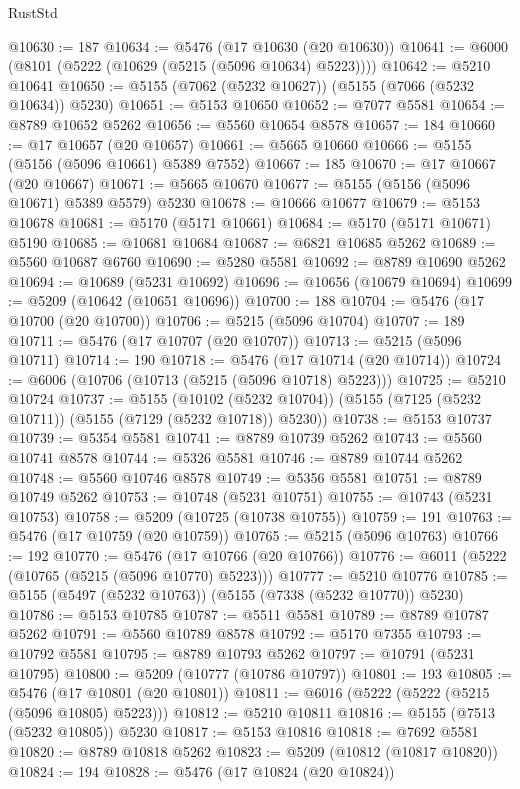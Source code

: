 \begin{lexlean}{RustStd}
\begin{coremodule}
@10630 := 187
@10634 := @5476 (@17 @10630 (@20 @10630))
@10641 := @6000 (@8101 (@5222 (@10629 (@5215 (@5096 @10634) @5223))))
@10642 := @5210 @10641
@10650 := @5155 (@7062 (@5232 @10627)) (@5155 (@7066 (@5232 @10634)) @5230)
@10651 := @5153 @10650
@10652 := @7077 @5581
@10654 := @8789 @10652 @5262
@10656 := @5560 @10654 @8578
@10657 := 184
@10660 := @17 @10657 (@20 @10657)
@10661 := @5665 @10660
@10666 := @5155 (@5156 (@5096 @10661) @5389 @7552)
@10667 := 185
@10670 := @17 @10667 (@20 @10667)
@10671 := @5665 @10670
@10677 := @5155 (@5156 (@5096 @10671) @5389 @5579) @5230
@10678 := @10666 @10677
@10679 := @5153 @10678
@10681 := @5170 (@5171 @10661)
@10684 := @5170 (@5171 @10671) @5190
@10685 := @10681 @10684
@10687 := @6821 @10685 @5262
@10689 := @5560 @10687 @6760
@10690 := @5280 @5581
@10692 := @8789 @10690 @5262
@10694 := @10689 (@5231 @10692)
@10696 := @10656 (@10679 @10694)
@10699 := @5209 (@10642 (@10651 @10696))
@10700 := 188
@10704 := @5476 (@17 @10700 (@20 @10700))
@10706 := @5215 (@5096 @10704)
@10707 := 189
@10711 := @5476 (@17 @10707 (@20 @10707))
@10713 := @5215 (@5096 @10711)
@10714 := 190
@10718 := @5476 (@17 @10714 (@20 @10714))
@10724 := @6006 (@10706 (@10713 (@5215 (@5096 @10718) @5223)))
@10725 := @5210 @10724
@10737 := @5155
    (@10102 (@5232 @10704))
    (@5155 (@7125 (@5232 @10711)) (@5155 (@7129 (@5232 @10718)) @5230))
@10738 := @5153 @10737
@10739 := @5354 @5581
@10741 := @8789 @10739 @5262
@10743 := @5560 @10741 @8578
@10744 := @5326 @5581
@10746 := @8789 @10744 @5262
@10748 := @5560 @10746 @8578
@10749 := @5356 @5581
@10751 := @8789 @10749 @5262
@10753 := @10748 (@5231 @10751)
@10755 := @10743 (@5231 @10753)
@10758 := @5209 (@10725 (@10738 @10755))
@10759 := 191
@10763 := @5476 (@17 @10759 (@20 @10759))
@10765 := @5215 (@5096 @10763)
@10766 := 192
@10770 := @5476 (@17 @10766 (@20 @10766))
@10776 := @6011 (@5222 (@10765 (@5215 (@5096 @10770) @5223)))
@10777 := @5210 @10776
@10785 := @5155 (@5497 (@5232 @10763)) (@5155 (@7338 (@5232 @10770)) @5230)
@10786 := @5153 @10785
@10787 := @5511 @5581
@10789 := @8789 @10787 @5262
@10791 := @5560 @10789 @8578
@10792 := @5170 @7355
@10793 := @10792 @5581
@10795 := @8789 @10793 @5262
@10797 := @10791 (@5231 @10795)
@10800 := @5209 (@10777 (@10786 @10797))
@10801 := 193
@10805 := @5476 (@17 @10801 (@20 @10801))
@10811 := @6016 (@5222 (@5222 (@5215 (@5096 @10805) @5223)))
@10812 := @5210 @10811
@10816 := @5155 (@7513 (@5232 @10805)) @5230
@10817 := @5153 @10816
@10818 := @7692 @5581
@10820 := @8789 @10818 @5262
@10823 := @5209 (@10812 (@10817 @10820))
@10824 := 194
@10828 := @5476 (@17 @10824 (@20 @10824))

\end{coremodule}
\end{lexlean}
